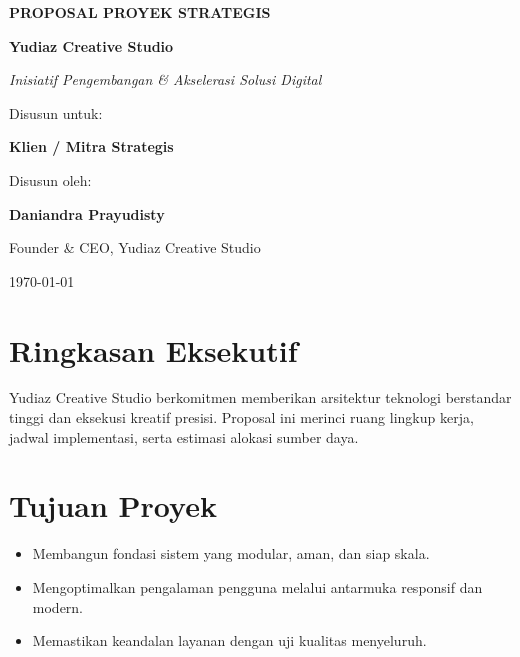 \documentclass[11pt,a4paper]{article}
\begin{document}
\begin{titlepage}
    \centering
    \vspace*{2cm}
    {\Huge\bfseries\color{brandNavy} PROPOSAL PROYEK STRATEGIS\par}
    \vspace{0.5cm}
    {\large\bfseries\color{brandGold} Yudiaz Creative Studio\par}
    \vspace{2cm}
    {\Large\itshape Inisiatif Pengembangan \& Akselerasi Solusi Digital\par}
    \vfill
    {\large Disusun untuk:\par}
    {\large\bfseries Klien / Mitra Strategis\par}
    \vfill
    {\large Disusun oleh:\par}
    {\large\bfseries Daniandra Prayudisty\par}
    {\normalsize Founder \& CEO, Yudiaz Creative Studio\par}
    \vspace{1cm}
    {\normalsize \today\par}
\end{titlepage}

\section{Ringkasan Eksekutif}
Yudiaz Creative Studio berkomitmen memberikan arsitektur teknologi berstandar tinggi dan eksekusi kreatif presisi. Proposal ini merinci ruang lingkup kerja, jadwal implementasi, serta estimasi alokasi sumber daya.

\section{Tujuan Proyek}
\begin{itemize}
    \item Membangun fondasi sistem yang modular, aman, dan siap skala.
    \item Mengoptimalkan pengalaman pengguna melalui antarmuka responsif dan modern.
    \item Memastikan keandalan layanan dengan uji kualitas menyeluruh.
\end{itemize}
\end{document}
